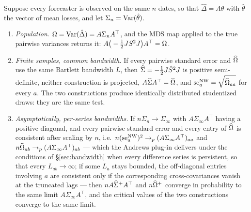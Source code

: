 \begin{proposition}
\label{prop:equivalence}
Suppose every forecaster is observed on the same $n$ dates, so that
$\hat\Delta=A\hat\theta$ with $\hat\theta$ the vector of mean losses, and let
$\Sigma_n=\operatorname{Var}(\hat\theta)$.
\begin{enumerate}[label=(\roman*)]
  \item \emph{Population.} $\Omega=\operatorname{Var}(\hat\Delta)=A\Sigma_nA^\top$, and the MDS
    map applied to the true pairwise variances returns it:
    $A\big(-\tfrac12 JS^2J\big)A^\top=\Omega$.
  \item \emph{Finite samples, common bandwidth.} If every pairwise standard error and
    $\widehat{\Omega}$ use the same Bartlett bandwidth $L$, then $\widehat{\Sigma}=-\tfrac12 J\hat S^2J$ is
    positive semi-definite, neither construction is projected, $A\widehat{\Sigma} A^\top=\widehat{\Omega}$,
    and $\mathrm{se}^{\mathrm{NW}}_{a}=\sqrt{\widehat{\Omega}_{aa}}$ for every $a$. The two constructions produce
    identically distributed studentized draws: they are the same test.
  \item \emph{Asymptotically, per-series bandwidths.} If $n\Sigma_n\to\Sigma_\infty$ with
    $A\Sigma_\infty A^\top$ having a positive diagonal, and every pairwise standard error
    and every entry of $\widehat{\Omega}$ is consistent after scaling by $n$, i.e.\
    $n(\mathrm{se}^{\mathrm{NW}}_{a})^2\to_p(A\Sigma_\infty A^\top)_{aa}$ and
    $n\widehat{\Omega}_{ab}\to_p(A\Sigma_\infty A^\top)_{ab}$ --- which the Andrews plug-in
    delivers under the conditions of \S\ref{sec:bandwidth} when every difference series
    is persistent, so that every $L_{ab}\to\infty$; if some $L_a$ stays bounded, the
    off-diagonal entries involving $a$ are consistent only if the corresponding
    cross-covariances vanish at the truncated lags --- then
    $nA\widehat{\Sigma}^{+}A^\top$ and $n\widehat{\Omega}^{+}$ converge in probability to the same limit
    $A\Sigma_\infty A^\top$, and the critical values of the two constructions converge to
    the same limit.
\end{enumerate}
\end{proposition}

